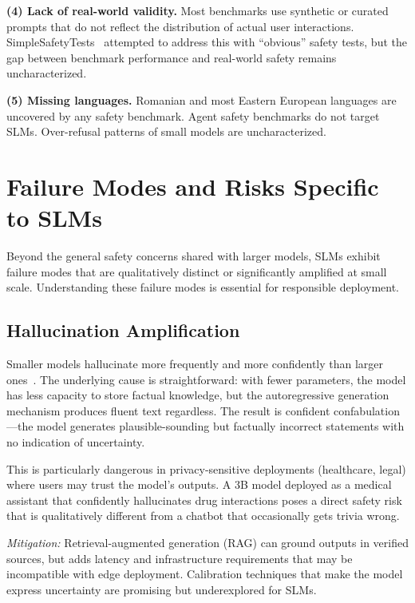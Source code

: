 \documentclass[12pt,a4paper]{article}
\begin{document}
\textbf{(4) Lack of real-world validity.} Most benchmarks use synthetic or curated prompts that do not reflect the distribution of actual user interactions. SimpleSafetyTests~\citep{vidgen2023simplesafety} attempted to address this with ``obvious'' safety tests, but the gap between benchmark performance and real-world safety remains uncharacterized.

\textbf{(5) Missing languages.} Romanian and most Eastern European languages are uncovered by any safety benchmark. Agent safety benchmarks do not target SLMs. Over-refusal patterns of small models are uncharacterized.

\section{Failure Modes and Risks Specific to SLMs}\label{sec:failures}

Beyond the general safety concerns shared with larger models, SLMs exhibit failure modes that are qualitatively distinct or significantly amplified at small scale. Understanding these failure modes is essential for responsible deployment.

\subsection{Hallucination Amplification}

Smaller models hallucinate more frequently and more confidently than larger ones~\citep{lin2022truthfulqa}. The underlying cause is straightforward: with fewer parameters, the model has less capacity to store factual knowledge, but the autoregressive generation mechanism produces fluent text regardless. The result is confident confabulation---the model generates plausible-sounding but factually incorrect statements with no indication of uncertainty.

This is particularly dangerous in privacy-sensitive deployments (healthcare, legal) where users may trust the model's outputs. A 3B model deployed as a medical assistant that confidently hallucinates drug interactions poses a direct safety risk that is qualitatively different from a chatbot that occasionally gets trivia wrong.

\emph{Mitigation:} Retrieval-augmented generation (RAG) can ground outputs in verified sources, but adds latency and infrastructure requirements that may be incompatible with edge deployment. Calibration techniques that make the model express uncertainty are promising but underexplored for SLMs.
\end{document}
